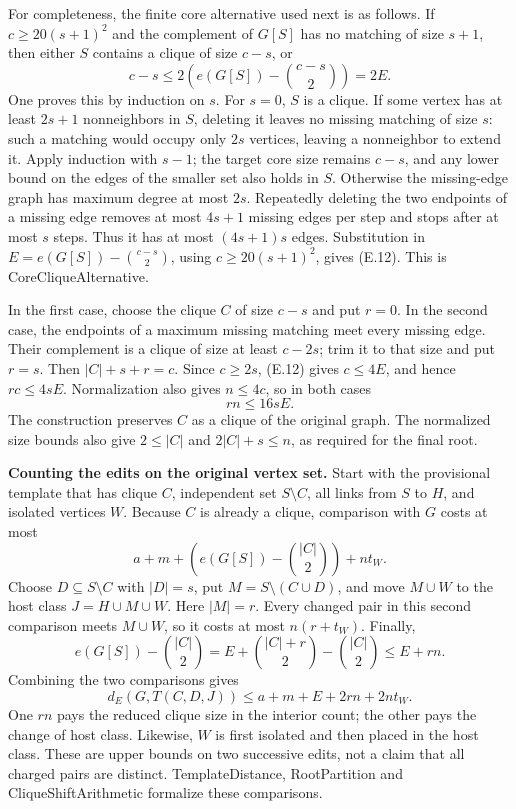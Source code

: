 \documentclass[english,11pt,a4paper]{article}
\begin{document}
For completeness, the finite core alternative used next is as follows. If \(c\ge20(s+1)^2\) and the complement of \(G[S]\) has no matching of size \(s+1\), then either \(S\) contains a clique of size \(c-s\), or \[
c-s\le2\left(e(G[S])-\binom{c-s}{2}\right)=2E.
\tag{E.12}
\] One proves this by induction on \(s\). For \(s=0\), \(S\) is a clique. If some vertex has at least \(2s+1\) nonneighbors in \(S\), deleting it leaves no missing matching of size \(s\): such a matching would occupy only \(2s\) vertices, leaving a nonneighbor to extend it. Apply induction with \(s-1\); the target core size remains \(c-s\), and any lower bound on the edges of the smaller set also holds in \(S\). Otherwise the missing-edge graph has maximum degree at most \(2s\). Repeatedly deleting the two endpoints of a missing edge removes at most \(4s+1\) missing edges per step and stops after at most \(s\) steps. Thus it has at most \((4s+1)s\) edges. Substitution in \(E=e(G[S])-\binom{c-s}{2}\), using \(c\ge20(s+1)^2\), gives (E.12). This is CoreCliqueAlternative.

In the first case, choose the clique \(C\) of size \(c-s\) and put \(r=0\). In the second case, the endpoints of a maximum missing matching meet every missing edge. Their complement is a clique of size at least \(c-2s\); trim it to that size and put \(r=s\). Then \(|C|+s+r=c\). Since \(c\ge2s\), (E.12) gives \(c\le4E\), and hence \(rc\le4sE\). Normalization also gives \(n\le4c\), so in both cases \[
rn\le16sE.
\tag{E.13}
\] The construction preserves \(C\) as a clique of the original graph. The normalized size bounds also give \(2\le|C|\) and \(2|C|+s\le n\), as required for the final root.

\textbf{Counting the edits on the original vertex set.} Start with the provisional template that has clique \(C\), independent set \(S\setminus C\), all links from \(S\) to \(H\), and isolated vertices \(W\). Because \(C\) is already a clique, comparison with \(G\) costs at most \[
a+m+\left(e(G[S])-\binom{|C|}{2}\right)+nt_W.
\] Choose \(D\subseteq S\setminus C\) with \(|D|=s\), put \(M=S\setminus(C\cup D)\), and move \(M\cup W\) to the host class \(J=H\cup M\cup W\). Here \(|M|=r\). Every changed pair in this second comparison meets \(M\cup W\), so it costs at most \(n(r+t_W)\). Finally, \[
e(G[S])-\binom{|C|}{2}
=E+\binom{|C|+r}{2}-\binom{|C|}{2}
\le E+rn.
\] Combining the two comparisons gives \[
d_E(G,T(C,D,J))\le a+m+E+2rn+2nt_W.
\tag{E.14}
\] One \(rn\) pays the reduced clique size in the interior count; the other pays the change of host class. Likewise, \(W\) is first isolated and then placed in the host class. These are upper bounds on two successive edits, not a claim that all charged pairs are distinct. TemplateDistance, RootPartition and CliqueShiftArithmetic formalize these comparisons.
\end{document}
